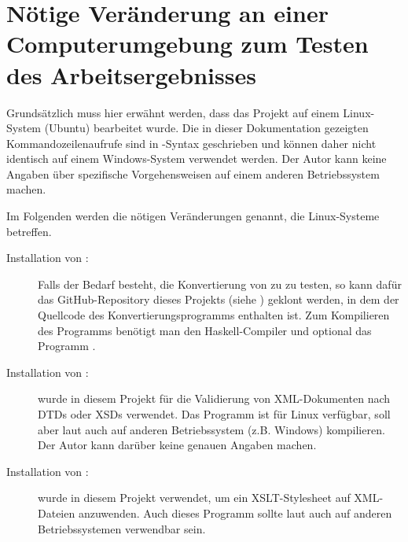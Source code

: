 \section[Nötige Veränderungen an einer Computerumgebung]{
    Nötige Veränderung an einer Computerumgebung zum Testen des Arbeitsergebnisses
}

Grundsätzlich muss hier erwähnt werden, dass das Projekt auf einem Linux-System
(Ubuntu) bearbeitet wurde. Die in dieser Dokumentation gezeigten
Kommandozeilenaufrufe sind in -Syntax geschrieben und können daher
nicht identisch auf einem Windows-System verwendet werden. Der Autor kann keine
Angaben über spezifische Vorgehensweisen auf einem anderen Betriebssystem
machen.

Im Folgenden werden die nötigen Veränderungen genannt, die Linux-Systeme
betreffen.
\begin{description}
    \item[Installation von :] Falls der Bedarf besteht, die
        Konvertierung von \BibTeX{} zu \BibTeXXML{} zu testen, so kann dafür
        das GitHub-Repository dieses Projekts (siehe \cite{github-bibtex-xml})
        geklont werden, in dem der Quellcode des Konvertierungsprogramms
        enthalten ist. Zum Kompilieren des Programms benötigt man den
        Haskell-Compiler  und optional das Programm .
    \item[Installation von :]  wurde in diesem
        Projekt für die Validierung von XML-Dokumenten nach DTDs oder XSDs
        verwendet. Das Programm ist für Linux verfügbar, soll aber laut
        \cite{xmlsoft-org} auch auf anderen Betriebssystem (z.B. Windows)
        kompilieren. Der Autor kann darüber keine genauen Angaben machen.
    \item[Installation von :]  wurde in diesem
        Projekt verwendet, um ein XSLT-Stylesheet auf XML-Dateien anzuwenden.
        Auch dieses Programm sollte laut \cite{xmlsoft-org} auch auf anderen
        Betriebssystemen verwendbar sein.
\end{description}